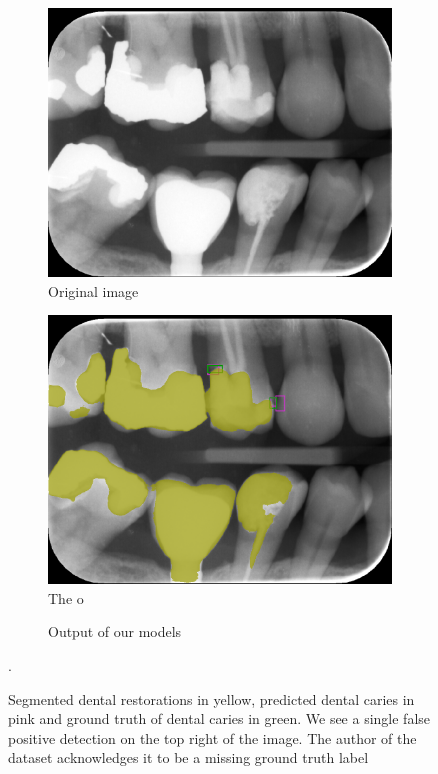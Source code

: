 \begin{figure}[h]
    \centering
    \begin{subfigure}[b]{0.8\textwidth}
        \includegraphics[width=1\linewidth]{images/det2orig.png}
        \caption{Original image}
    \end{subfigure}
    \begin{subfigure}[b]{0.8\textwidth}
        \includegraphics[width=1\linewidth]{images/det2pred.png}
        The o\caption{Output of our models}
    \end{subfigure}
    \caption{Segmented dental restorations in yellow, predicted dental caries in pink and ground truth of dental caries in green. We see a single false positive detection on the top right of the image. The author of the dataset acknowledges it to be a missing ground truth label}.
    \label{fig:both_models_1}
\end{figure}
